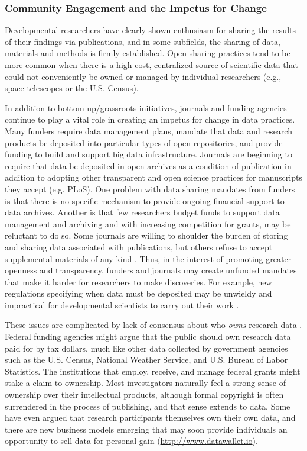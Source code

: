\documentclass[letterpaper,man,apacite,natbib]{apa6}
\begin{document}
\subsubsection{Community Engagement and the Impetus for Change}
Developmental researchers have clearly shown enthusiasm for sharing the results of their findings via publications, and in some subfields, the sharing of data, materials and methods is firmly established.
Open sharing practices tend to be more common when there is a high cost, centralized source of scientific data that could not conveniently be owned or managed by individual researchers (e.g., space telescopes or the U.S. Census).

In addition to bottom-up/grassroots initiatives, journals and funding agencies continue to play a vital role in creating an impetus for change in data practices.
Many funders require data management plans, mandate that data and research products be deposited into particular types of open repositories, and provide funding to build and support big data infrastructure.
Journals are beginning to require that data be deposited in open archives as a condition of publication in addition to adopting other transparent and open science practices for manuscripts they accept (e.g. PLoS).
One problem with data sharing mandates from funders is that there is no specific mechanism to provide ongoing financial support to data archives.
Another is that few researchers budget funds to support data management and archiving and with increasing competition for grants, may be reluctant to do so.
Some journals are willing to shoulder the burden of storing and sharing data associated with publications, but others refuse to accept supplemental materials of any kind \cite{maunsell_announcement_2010}.
Thus, in the interest of promoting greater openness and transparency, funders and journals may create unfunded mandates that make it harder for researchers to make discoveries.
For example, new regulations specifying when data must be deposited may be unwieldy and impractical for developmental scientists to carry out their work \cite{eisenberg_thoughts_2015, apa_data_sharing_work_group_data_2015}.

These issues are complicated by lack of consensus about who \emph{owns} research data \cite{who_owns_research_data}.
Federal funding agencies might argue that the public should own research data paid for by tax dollars, much like other data collected by government agencies such as the U.S. Census, National Weather Service, and U.S. Bureau of Labor Statistics.
The institutions that employ, receive, and manage federal grants might stake a claim to ownership.
Most investigators naturally feel a strong sense of ownership over their intellectual products, although formal copyright is often surrendered in the process of publishing, and that sense extends to data.
Some have even argued that research participants themselves own their own data, and there are new business models emerging that may soon provide individuals an opportunity to sell data for personal gain (\url{http://www.datawallet.io}).
\end{document}

